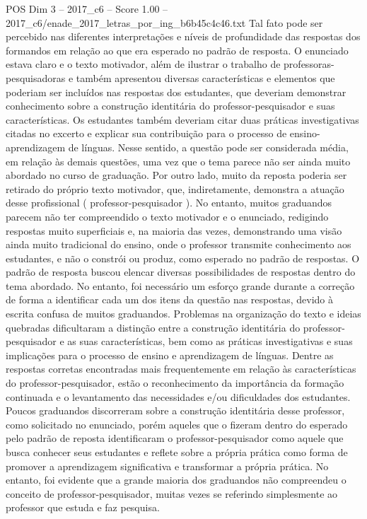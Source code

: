 \begin{textsample}{POS Dim 3 – 2017\_c6 – Score 1.00 – 2017\_c6/enade\_2017\_letras\_por\_ing\_b6b45c4c46.txt}
Tal fato pode ser percebido nas diferentes interpretações e níveis de profundidade das respostas dos formandos em relação ao que era esperado no padrão de resposta.
O enunciado estava claro e o texto motivador, além de ilustrar o trabalho de professoras-pesquisadoras e também apresentou diversas características e elementos que poderiam ser incluídos nas respostas dos estudantes, que deveriam demonstrar conhecimento sobre a construção identitária do professor-pesquisador e suas características.
Os estudantes também deveriam citar duas práticas investigativas citadas no excerto e explicar sua contribuição para o processo de ensino-aprendizagem de línguas.
Nesse sentido, a questão pode ser considerada média, em relação às demais questões, uma vez que o tema parece não ser ainda muito abordado no curso de graduação.
Por outro lado, muito da reposta poderia ser retirado do próprio texto motivador, que, indiretamente, demonstra a atuação desse profissional ( professor-pesquisador ).
No entanto, muitos graduandos parecem não ter compreendido o texto motivador e o enunciado, redigindo respostas muito superficiais e, na maioria das vezes, demonstrando uma visão ainda muito tradicional do ensino, onde o professor transmite conhecimento aos estudantes, e não o constrói ou produz, como esperado no padrão de respostas.
O padrão de resposta buscou elencar diversas possibilidades de respostas dentro do tema abordado.
No entanto, foi necessário um esforço grande durante a correção de forma a identificar cada um dos itens da questão nas respostas, devido à escrita confusa de muitos graduandos.
Problemas na organização do texto e ideias quebradas dificultaram a distinção entre a construção identitária do professor-pesquisador e as suas características, bem como as práticas investigativas e suas implicações para o processo de ensino e aprendizagem de línguas.
Dentre as respostas corretas encontradas mais frequentemente em relação às características do professor-pesquisador, estão o reconhecimento da importância da formação continuada e o levantamento das necessidades e/ou dificuldades dos estudantes.
Poucos graduandos discorreram sobre a construção identitária desse professor, como solicitado no enunciado, porém aqueles que o fizeram dentro do esperado pelo padrão de reposta identificaram o professor-pesquisador como aquele que busca conhecer seus estudantes e reflete sobre a própria prática como forma de promover a aprendizagem significativa e transformar a própria prática.
No entanto, foi evidente que a grande maioria dos graduandos não compreendeu o conceito de professor-pesquisador, muitas vezes se referindo simplesmente ao professor que estuda e faz pesquisa.

\end{textsample}
